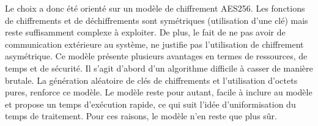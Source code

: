 Le choix a donc été orienté sur un modèle de chiffrement AES256. Les fonctions de chiffrements et de déchiffrements sont symétriques (utilisation d'une clé) mais reste suffisamment complexe à exploiter. De plus, le fait de ne pas avoir de communication extérieure au système, ne justifie pas l'utilisation de chiffrement asymétrique.
Ce modèle présente plusieurs avantages en termes de ressources, de temps et de sécurité.
Il s'agit d'abord d'un algorithme difficile à casser de manière brutale. La génération aléatoire de clés de chiffrements et l'utilisation d'octets pures, renforce ce modèle.
Le modèle reste pour autant, facile à inclure au modèle et propose un temps d'exécution rapide, ce qui suit l'idée d'uniformisation du temps de traitement. 
Pour ces raisons, le modèle n'en reste que plus sûr.